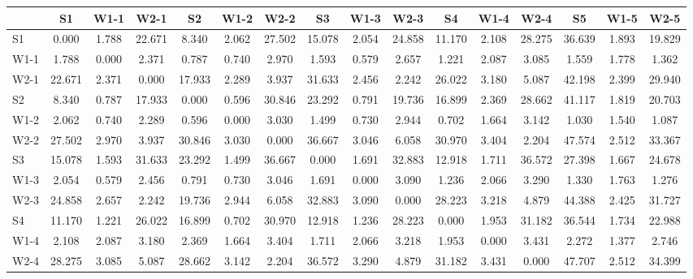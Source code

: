 \begin{table*}[h!]
\begin{center}
\begin{tabular}{| l | c | c | c | c | c | c | c | c | c | c | c | c | c | c | c |}\hline
 & S1 & W1-1 & W2-1 & S2 & W1-2 & W2-2 & S3 & W1-3 & W2-3 & S4 & W1-4 & W2-4 & S5 & W1-5 & W2-5 \\\hline
S1 & 0.000  & 1.788  & 22.671  & 8.340  & 2.062  & 27.502  & 15.078  & 2.054  & 24.858  & 11.170  & 2.108  & 28.275  & 36.639  & 1.893  & 19.829 \\\hline
W1-1 & 1.788  & 0.000  & 2.371  & 0.787  & 0.740  & 2.970  & 1.593  & 0.579  & 2.657  & 1.221  & 2.087  & 3.085  & 1.559  & 1.778  & 1.362 \\\hline
W2-1 & 22.671  & 2.371  & 0.000  & 17.933  & 2.289  & 3.937  & 31.633  & 2.456  & 2.242  & 26.022  & 3.180  & 5.087  & 42.198  & 2.399  & 29.940 \\\hline
S2 & 8.340  & 0.787  & 17.933  & 0.000  & 0.596  & 30.846  & 23.292  & 0.791  & 19.736  & 16.899  & 2.369  & 28.662  & 41.117  & 1.819  & 20.703 \\\hline
W1-2 & 2.062  & 0.740  & 2.289  & 0.596  & 0.000  & 3.030  & 1.499  & 0.730  & 2.944  & 0.702  & 1.664  & 3.142  & 1.030  & 1.540  & 1.087 \\\hline
W2-2 & 27.502  & 2.970  & 3.937  & 30.846  & 3.030  & 0.000  & 36.667  & 3.046  & 6.058  & 30.970  & 3.404  & 2.204  & 47.574  & 2.512  & 33.367 \\\hline
S3 & 15.078  & 1.593  & 31.633  & 23.292  & 1.499  & 36.667  & 0.000  & 1.691  & 32.883  & 12.918  & 1.711  & 36.572  & 27.398  & 1.667  & 24.678 \\\hline
W1-3 & 2.054  & 0.579  & 2.456  & 0.791  & 0.730  & 3.046  & 1.691  & 0.000  & 3.090  & 1.236  & 2.066  & 3.290  & 1.330  & 1.763  & 1.276 \\\hline
W2-3 & 24.858  & 2.657  & 2.242  & 19.736  & 2.944  & 6.058  & 32.883  & 3.090  & 0.000  & 28.223  & 3.218  & 4.879  & 44.388  & 2.425  & 31.727 \\\hline
S4 & 11.170  & 1.221  & 26.022  & 16.899  & 0.702  & 30.970  & 12.918  & 1.236  & 28.223  & 0.000  & 1.953  & 31.182  & 36.544  & 1.734  & 22.988 \\\hline
W1-4 & 2.108  & 2.087  & 3.180  & 2.369  & 1.664  & 3.404  & 1.711  & 2.066  & 3.218  & 1.953  & 0.000  & 3.431  & 2.272  & 1.377  & 2.746 \\\hline
W2-4 & 28.275  & 3.085  & 5.087  & 28.662  & 3.142  & 2.204  & 36.572  & 3.290  & 4.879  & 31.182  & 3.431  & 0.000  & 47.707  & 2.512  & 34.399 \\\hline

\end{tabular}
\end{center}
\end{table*}
